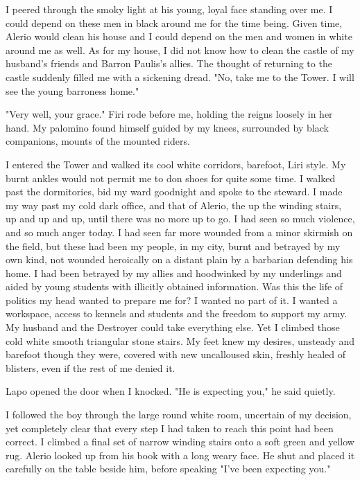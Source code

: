 \documentclass{article}
\begin{document}
I peered through the smoky light at his young, loyal face standing over me. I could depend on these men in black around me for the time being. Given time, Alerio would clean his house and I could depend on the men and women in white around me as well. As for my house, I did not know how to clean the castle of my husband's friends and Barron Paulis's allies. The thought of returning to the castle suddenly filled me with a sickening dread. "No, take me to the Tower. I will see the young barroness home."

"Very well, your grace." Firi rode before me, holding the reigns loosely in her hand. My palomino found himself guided by my knees, surrounded by black companions, mounts of the mounted riders. 

I entered the Tower and walked its cool white corridors, barefoot, Liri style. My burnt ankles would not permit me to don shoes for quite some time. I walked past the dormitories, bid my ward goodnight and spoke to the steward. I made my way past my cold dark office, and that of Alerio, the up the winding stairs, up and up and up, until there was no more up to go. I had seen so much violence, and so much anger today. I had seen far more wounded from a minor skirmish on the field, but these had been my people, in my city, burnt and betrayed by my own kind, not wounded heroically on a distant plain by a barbarian defending his home. I had been betrayed by my allies and hoodwinked by my  underlings and aided by young students with illicitly obtained information. Was this the life of politics my head wanted to prepare me for? I wanted no part of it. I wanted a workspace, access to kennels and students and the freedom to support my army. My husband and the Destroyer could take everything else. Yet I climbed those cold white smooth triangular stone stairs. My feet knew my desires, unsteady and barefoot though they were, covered with new uncalloused skin, freshly healed of blisters, even if the rest of me denied it.

Lapo opened the door when I knocked. "He is expecting you," he said quietly.

I followed the boy through the large round white room, uncertain of my decision, yet completely clear that every step I had taken to reach this point had been correct. I climbed a final set of narrow winding stairs onto a soft green and yellow rug. Alerio looked up from his book with a long weary face. He shut and placed it carefully on the table beside him, before speaking "I've been expecting you."
\end{document}

